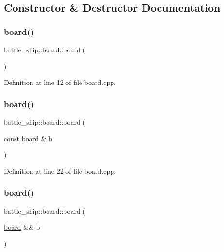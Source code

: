 \subsection{Constructor \& Destructor Documentation}
\mbox{\label{classbattle__ship_1_1board_a4d561505fe0c5d355e70bbd2bde1b00e}} 
\subsubsection{\texorpdfstring{board()}{board()}\hspace{0.1cm}{\footnotesize\ttfamily [1/3]}}
{\footnotesize\ttfamily battle\+\_\+ship\+::board\+::board (\begin{DoxyParamCaption}{ }\end{DoxyParamCaption})}



Definition at line 12 of file board.\+cpp.

\mbox{\label{classbattle__ship_1_1board_a72bdef4b84b4c2d8241b4307cae2cb9e}} 
\subsubsection{\texorpdfstring{board()}{board()}\hspace{0.1cm}{\footnotesize\ttfamily [2/3]}}
{\footnotesize\ttfamily battle\+\_\+ship\+::board\+::board (\begin{DoxyParamCaption}\item[{const \hyperlink{classbattle__ship_1_1board}{board} \&}]{b }\end{DoxyParamCaption})}



Definition at line 22 of file board.\+cpp.

\mbox{\label{classbattle__ship_1_1board_aae7ac9e7bbd44c1b2d7a745721936ee2}} 
\subsubsection{\texorpdfstring{board()}{board()}\hspace{0.1cm}{\footnotesize\ttfamily [3/3]}}
{\footnotesize\ttfamily battle\+\_\+ship\+::board\+::board (\begin{DoxyParamCaption}\item[{\hyperlink{classbattle__ship_1_1board}{board} \&\&}]{b }\end{DoxyParamCaption})}



